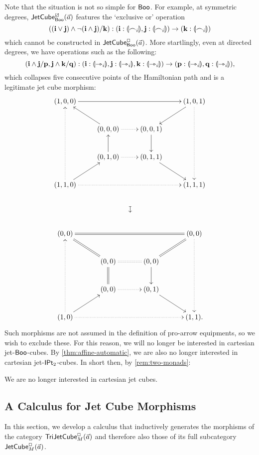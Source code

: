 \documentclass[a4paper]{memoir}
\begin{document}
Note that the situation is not so simple for $\mathsf{Boo}$.
For example, at symmetric degrees, $\mathsf{JetCube}^{\boxslash}_{\mathsf{Boo}}\mathopen{}\left( \vec a \right)\mathclose{}$ features the `exclusive or' operation
\[
	((\mathbf{i} \vee \mathbf{j}) \wedge \lnot(\mathbf{i} \wedge \mathbf{j})/\mathbf{k}) : (\mathbf{i} : {\llparenthesis \frown_i \rrparenthesis}, \mathbf{j} : {\llparenthesis \frown_i \rrparenthesis}) \to (\mathbf{k} : {\llparenthesis \frown_i \rrparenthesis})
\]
which cannot be constructed in $\mathsf{JetCube}^{\Box}_{\mathsf{Boo}}\mathopen{}\left( \vec a \right)\mathclose{}$.
More startlingly, even at directed degrees, we have operations such as the following:
\[
	(\mathbf{i} \wedge \mathbf{j}/\mathbf{p}, \mathbf{j} \wedge \mathbf{k}/\mathbf{q}) : (\mathbf{i} : {\llparenthesis \rightarrowtriangle_i \rrparenthesis}, \mathbf{j} : {\llparenthesis \rightarrowtriangle_i \rrparenthesis}, \mathbf{k} : {\llparenthesis \rightarrowtriangle_i \rrparenthesis}) \to (\mathbf{p} : {\llparenthesis \rightarrowtriangle_i \rrparenthesis}, \mathbf{q} : {\llparenthesis \rightarrowtriangle_i \rrparenthesis}),
\]
which collapses five consecutive points of the Hamiltonian path and is a legitimate jet cube morphism:
\[
	\xymatrix{
		(1, 0, 0)
			\ar[rrr]
		&&& (1, 0, 1)
			\ar[ld]
			\ar@{.>}[ddd]
		\\
		& (0, 0, 0)
			\ar[lu]
			\ar@{.>}[r]
		& (0, 0, 1)
			\ar[d]
		\\
		& (0, 1, 0)
			\ar[u]
			\ar@{.>}[r]
		& (0, 1, 1)
			\ar[rd]
		\\
		(1, 1, 0)
			\ar[ru]
			\ar@{.>}[uuu]
			\ar@{.>}[rrr]
			\ar@{}[rrrdd]|{\rotatebox{270}{$\mapsto$}}
		&&& (1, 1, 1)
		\\
		\\
		(0, 0)
			\ar@{=}[rrr]
		&&& (0, 0)
			\ar@{=}[ld]
			\ar@{.>}[ddd]
		\\
		& (0, 0)
			\ar@{=}[lu]
			\ar@{:}[r]
		& (0, 0)
			\ar[d]
		\\
		& (0, 0)
			\ar@{=}[u]
			\ar@{.>}[r]
		& (0, 1)
			\ar[rd]
		\\
		(1, 0)
			\ar[ru]
			\ar@{.>}[uuu]
			\ar@{.>}[rrr]
		&&& (1, 1).
	}
\]
Such morphisms are not assumed in the definition of pro-arrow equipments, so we wish to exclude these.
For this reason, we will no longer be interested in cartesian jet-$\mathsf{Boo}$-cubes.
By \cref{thm:affine-automatic}, we are also no longer interested in cartesian jet-${\mathsf{IPt}_2}$-cubes.
In short then, by \cref{rem:two-monads}:
\begin{remark} \label{rem:no-cartesian}
	We are no longer interested in cartesian jet cubes.
\end{remark}

\subsection{A Calculus for Jet Cube Morphisms}
In this section, we develop a calculus that inductively generates the morphisms of the category \allowbreak $\mathsf{TriJetCube}^{\Box}_{M}\mathopen{}\left( \vec a \right)\mathclose{}$ and therefore also those of its full subcategory $\mathsf{JetCube}^{\Box}_{M}\mathopen{}\left( \vec a \right)\mathclose{}$.
\end{document}
